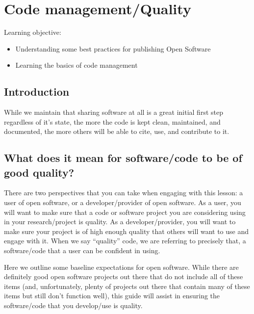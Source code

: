 \documentclass[
  letterpaper,
  DIV=11,
  numbers=noendperiod]{scrreport}
\providecommand{\tightlist}{%
  \setlength{\itemsep}{0pt}\setlength{\parskip}{0pt}}\usepackage{longtable,booktabs,array}
\begin{document}
\hypertarget{code-managementquality}{%
\chapter{Code management/Quality}\label{code-managementquality}}

Learning objective:

\begin{itemize}
\tightlist
\item
  Understanding some best practices for publishing Open Software
\item
  Learning the basics of code management
\end{itemize}

\hypertarget{introduction-7}{%
\section{Introduction}\label{introduction-7}}

While we maintain that sharing software at all is a great initial first
step regardless of it's state, the more the code is kept clean,
maintained, and documented, the more others will be able to cite, use,
and contribute to it.

\hypertarget{what-does-it-mean-for-softwarecode-to-be-of-good-quality}{%
\section{What does it mean for software/code to be of good
quality?}\label{what-does-it-mean-for-softwarecode-to-be-of-good-quality}}

There are two perspectives that you can take when engaging with this
lesson: a user of open software, or a developer/provider of open
software. As a user, you will want to make sure that a code or software
project you are considering using in your research/project is quality.
As a developer/provider, you will want to make sure your project is of
high enough quality that others will want to use and engage with it.
When we say ``quality'' code, we are referring to precisely that, a
software/code that a user can be confident in using.

Here we outline some baseline expectations for open software. While
there are definitely good open software projects out there that do not
include all of these items (and, unfortunately, plenty of projects out
there that contain many of these items but still don't function well),
this guide will assist in ensuring the software/code that you
develop/use is quality.
\end{document}
